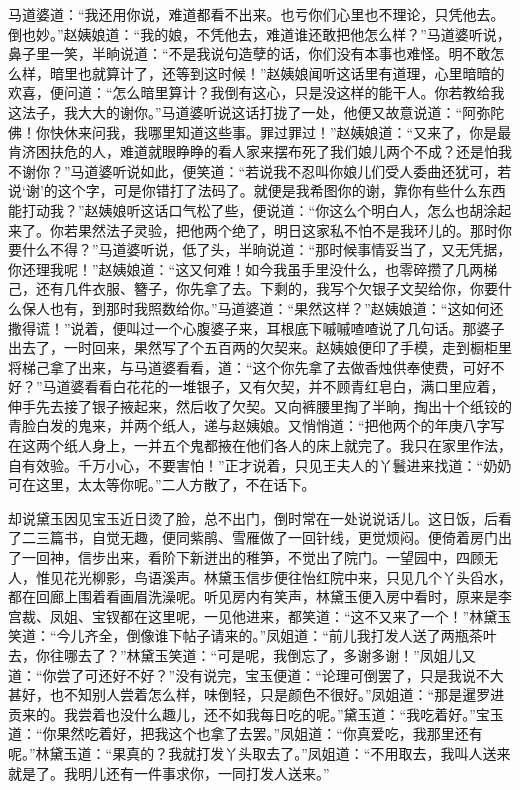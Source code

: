 \documentclass[12pt,oneside]{book}
\begin{document}
马道婆道：“我还用你说，难道都看不出来。也亏你们心里也不理论，只凭他去。倒也妙。”赵姨娘道：“我的娘，不凭他去，难道谁还敢把他怎么样？”马道婆听说，鼻子里一笑，半晌说道：“不是我说句造孽的话，你们没有本事也难怪。明不敢怎么样，暗里也就算计了，还等到这时候！”赵姨娘闻听这话里有道理，心里暗暗的欢喜，便问道：“怎么暗里算计？我倒有这心，只是没这样的能干人。你若教给我这法子，我大大的谢你。”马道婆听说这话打拢了一处，他便又故意说道：“阿弥陀佛！你快休来问我，我哪里知道这些事。罪过罪过！”赵姨娘道：“又来了，你是最肯济困扶危的人，难道就眼睁睁的看人家来摆布死了我们娘儿两个不成？还是怕我不谢你？”马道婆听说如此，便笑道：“若说我不忍叫你娘儿们受人委曲还犹可，若说‘谢’的这个字，可是你错打了法码了。就便是我希图你的谢，靠你有些什么东西能打动我？”赵姨娘听这话口气松了些，便说道：“你这么个明白人，怎么也胡涂起来了。你若果然法子灵验，把他两个绝了，明日这家私不怕不是我环儿的。那时你要什么不得？”马道婆听说，低了头，半晌说道：“那时候事情妥当了，又无凭据，你还理我呢！”赵姨娘道：“这又何难！如今我虽手里没什么，也零碎攒了几两梯己，还有几件衣服、簪子，你先拿了去。下剩的，我写个欠银子文契给你，你要什么保人也有，到那时我照数给你。”马道婆道：“果然这样？”赵姨娘道：“这如何还撒得谎！”说着，便叫过一个心腹婆子来，耳根底下嘁嘁喳喳说了几句话。那婆子出去了，一时回来，果然写了个五百两的欠契来。赵姨娘便印了手模，走到橱柜里将梯己拿了出来，与马道婆看看，道：“这个你先拿了去做香烛供奉使费，可好不好？”马道婆看看白花花的一堆银子，又有欠契，并不顾青红皂白，满口里应着，伸手先去接了银子掖起来，然后收了欠契。又向裤腰里掏了半晌，掏出十个纸铰的青脸白发的鬼来，并两个纸人，递与赵姨娘。又悄悄道：“把他两个的年庚八字写在这两个纸人身上，一并五个鬼都掖在他们各人的床上就完了。我只在家里作法，自有效验。千万小心，不要害怕！”正才说着，只见王夫人的丫鬟进来找道：“奶奶可在这里，太太等你呢。”二人方散了，不在话下。

却说黛玉因见宝玉近日烫了脸，总不出门，倒时常在一处说说话儿。这日饭，后看了二三篇书，自觉无趣，便同紫鹃、雪雁做了一回针线，更觉烦闷。便倚着房门出了一回神，信步出来，看阶下新迸出的稚笋，不觉出了院门。一望园中，四顾无人，惟见花光柳影，鸟语溪声。林黛玉信步便往怡红院中来，只见几个丫头舀水，都在回廊上围着看画眉洗澡呢。听见房内有笑声，林黛玉便入房中看时，原来是李宫裁、凤姐、宝钗都在这里呢，一见他进来，都笑道：“这不又来了一个！”林黛玉笑道：“今儿齐全，倒像谁下帖子请来的。”凤姐道：“前儿我打发人送了两瓶茶叶去，你往哪去了？”林黛玉笑道：“可是呢，我倒忘了，多谢多谢！”凤姐儿又道：“你尝了可还好不好？”没有说完，宝玉便道：“论理可倒罢了，只是我说不大甚好，也不知别人尝着怎么样，味倒轻，只是颜色不很好。”凤姐道：“那是暹罗进贡来的。我尝着也没什么趣儿，还不如我每日吃的呢。”黛玉道：“我吃着好。”宝玉道：“你果然吃着好，把我这个也拿了去罢。”凤姐道：“你真爱吃，我那里还有呢。”林黛玉道：“果真的？我就打发丫头取去了。”凤姐道：“不用取去，我叫人送来就是了。我明儿还有一件事求你，一同打发人送来。”
\end{document}
